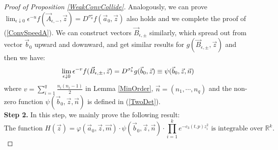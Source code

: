 \begin{proof}[Proof of Proposition \ref{WeakConvCollide}]
Analogously, we can prove $\lim_{\epsilon\downarrow 0}\epsilon^{-u}f(\vec{A}_{\epsilon,-},\vec{z})=D^{\sigma_{a}^{\star}}f(\vec{a}_0,\vec{z})$ also holds and we complete the proof of (\ref{ConvSpeedA}). We can construct vectors $\vec{B}_{\epsilon,\pm}$ similarly, which spread out from vector $\vec{b}_{0}$ upward and downward, and get similar results for $g(\vec{B}_{\epsilon,\pm},\vec{z})$ and then we have:
\begin{equation}{\label{ConvSpeedB}}
		\lim_{\epsilon\downarrow 0}\epsilon^{-v}f(\vec{B}_{\epsilon,\pm},\vec{z})=D^{\sigma_{b}^{\star}}g(\vec{b}_{0},\vec{z})\equiv\psi(\vec{b}_{0},\vec{z},\vec{n})
\end{equation}
where $v=\sum_{i=1}^{q}\frac{n_{i}(n_{i}-1)}{2}$ in Lemma \ref{MinOrder}, $\vec{n}=(n_{1},\cdots,n_{q})$ and the non-zero function $\psi(\vec{b}_{0},\vec{z},\vec{n})$ is defined in (\ref{TwoDet}).\\
\textbf{Step 2. }In this step, we mainly prove the following result:
\begin{equation}
	\text{The function } H(\vec{z})=\varphi(\vec{a}_{0},\vec{z},\vec{m})\cdot\psi(\vec{b}_{0},\vec{z},\vec{n})\cdot\prod_{i=1}^{k}e^{-c_{3}(t,p)z_{i}^{2}}\text{ is integrable over } \mathbb{R}^{k}.
\end{equation}


\end{proof}

